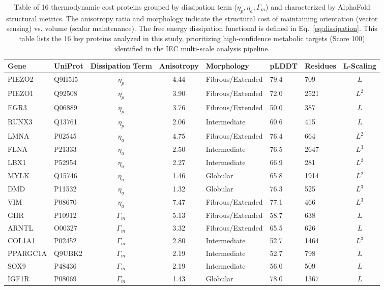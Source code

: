 \begin{table}[h!]
\centering
\caption{Table of 16 thermodynamic cost proteins grouped by dissipation term ($\eta_p, \eta_a, \Gamma_m$) and characterized by AlphaFold structural metrics. The anisotropy ratio and morphology indicate the structural cost of maintaining orientation (vector sensing) vs. volume (scalar maintenance). The free energy dissipation functional is defined in Eq.~\ref{eq:dissipation}. This table lists the 16 key proteins analyzed in this study, prioritizing high-confidence metabolic targets (Score 100) identified in the IEC multi-scale analysis pipeline.}
\label{tab:thermodynamic_cost_proteins}
\scriptsize
\begin{tabular}{llcclllc}
\toprule
\textbf{Gene} & \textbf{UniProt} & \textbf{Dissipation Term} & \textbf{Anisotropy} & \textbf{Morphology} & \textbf{pLDDT} & \textbf{Residues} & \textbf{L-Scaling} \\
\midrule
PIEZO2 & Q9H5I5 & $\eta_{p}$ & 4.44 & Fibrous/Extended & 79.4 & 709 & $L$ \\
PIEZO1 & Q92508 & $\eta_{p}$ & 3.90 & Fibrous/Extended & 72.0 & 2521 & $L^2$ \\
EGR3 & Q06889 & $\eta_{p}$ & 3.76 & Fibrous/Extended & 50.0 & 387 & $L$ \\
RUNX3 & Q13761 & $\eta_{p}$ & 2.06 & Intermediate & 60.6 & 415 & $L$ \\
\midrule
LMNA & P02545 & $\eta_{a}$ & 4.75 & Fibrous/Extended & 76.4 & 664 & $L^2$ \\
FLNA & P21333 & $\eta_{a}$ & 2.50 & Intermediate & 76.5 & 2647 & $L^3$ \\
LBX1 & P52954 & $\eta_{a}$ & 2.27 & Intermediate & 66.9 & 281 & $L^2$ \\
MYLK & Q15746 & $\eta_{a}$ & 1.46 & Globular & 65.8 & 1914 & $L^2$ \\
DMD & P11532 & $\eta_{a}$ & 1.32 & Globular & 76.3 & 525 & $L^3$ \\
VIM & P08670 & $\eta_{a}$ & 7.47 & Fibrous/Extended & 77.1 & 466 & $L^3$ \\
\midrule
GHR & P10912 & $\Gamma_{m}$ & 5.13 & Fibrous/Extended & 58.7 & 638 & $L$ \\
ARNTL & O00327 & $\Gamma_{m}$ & 3.32 & Fibrous/Extended & 65.5 & 626 & $L$ \\
COL1A1 & P02452 & $\Gamma_{m}$ & 2.80 & Intermediate & 52.7 & 1464 & $L^3$ \\
PPARGC1A & Q9UBK2 & $\Gamma_{m}$ & 2.19 & Intermediate & 52.7 & 798 & $L$ \\
SOX9 & P48436 & $\Gamma_{m}$ & 2.19 & Intermediate & 56.0 & 509 & $L$ \\
IGF1R & P08069 & $\Gamma_{m}$ & 1.43 & Globular & 78.0 & 1367 & $L$ \\
\bottomrule
\end{tabular}
\end{table}
